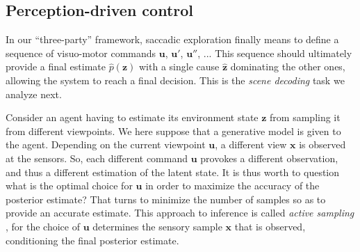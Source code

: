 \documentclass[12pt,twoside,openright]{article}
\begin{document}

\subsection{Perception-driven control}\label{sec:perception-driven-control}

In our ``three-party'' framework, 
saccadic exploration finally means to define a sequence of visuo-motor commands $\boldsymbol{u}$, $\boldsymbol{u}'$, $\boldsymbol{u}''$, ... This sequence should ultimately provide a final estimate $\hat{p}(\boldsymbol{z})$ with a single cause $\hat{\boldsymbol{z}}$ dominating the other ones, allowing the system to reach a final decision. This is the \emph{scene decoding} task we analyze next.





Consider an agent having to estimate its environment state $\boldsymbol{z}$ from sampling it from different viewpoints. We here suppose that a generative model  is given to the agent. 
Depending on  the current viewpoint $\boldsymbol{u}$, a different view $\boldsymbol{x}$ is observed at the sensors. So, each different command $\boldsymbol{u}$ provokes a different observation, and thus a different 
estimation of the latent state. It is thus worth to question what is the optimal choice for $\boldsymbol{u}$ in order to maximize the accuracy of the posterior estimate?
That turns  to minimize the number of samples so as to provide an accurate estimate. This approach to inference is called \emph{active sampling} \cite{friston2012perceptions}, for the choice of $\boldsymbol{u}$ determines the sensory sample $\boldsymbol{x}$ that is observed, conditioning the final posterior estimate.
\end{document}
